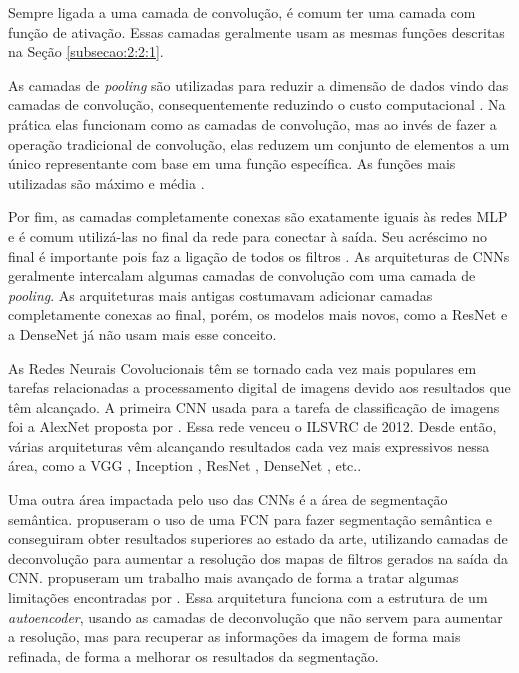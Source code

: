 Sempre ligada a uma camada de convolução, é comum ter uma camada com função de ativação. Essas camadas geralmente usam as mesmas funções descritas na Seção \ref{subsecao:2:2:1}.

As camadas de \textit{pooling} são utilizadas para reduzir a dimensão de dados vindo das camadas de convolução, consequentemente reduzindo o custo computacional \cite{ferreira-2017}. Na prática elas funcionam como as camadas de convolução, mas ao invés de fazer a operação tradicional de convolução, elas reduzem um conjunto de elementos a um único representante com base em uma função específica. As funções mais utilizadas são máximo e média \cite{ferreira-2017}.

Por fim, as camadas completamente conexas são exatamente iguais às redes MLP e é comum utilizá-las no final da rede para conectar à saída. Seu acréscimo no final é importante pois faz a ligação de todos os filtros \cite{ferreira-2017}. As arquiteturas de \ac{CNN}s geralmente intercalam algumas camadas de convolução com uma camada de \textit{pooling}. As arquiteturas mais antigas costumavam adicionar camadas completamente conexas ao final, porém, os modelos mais novos, como a \ac{ResNet} e a \ac{DenseNet} já não usam mais esse conceito.

As Redes Neurais Covolucionais têm se tornado cada vez mais populares em tarefas relacionadas a processamento digital de imagens devido aos resultados que têm alcançado. A primeira \ac{CNN} usada para a tarefa de classificação de imagens foi a AlexNet proposta por . Essa rede venceu o \ac{ILSVRC} de 2012. Desde então, várias arquiteturas vêm alcançando resultados cada vez mais expressivos nessa área, como a VGG \cite{simonyan-2014}, Inception \cite{szegedy-2015}, \ac{ResNet} \cite{he-2016}, \ac{DenseNet} \cite{liu-2017}, etc..

Uma outra área impactada pelo uso das \ac{CNN}s é a área de segmentação semântica.  propuseram o uso de uma \ac{FCN} para fazer segmentação semântica e conseguiram obter resultados superiores ao estado da arte, utilizando camadas de deconvolução para aumentar a resolução dos mapas de filtros gerados na saída da \ac{CNN}.  propuseram um trabalho mais avançado de forma a tratar algumas limitações encontradas por . Essa arquitetura funciona com a estrutura de um \textit{autoencoder}, usando as camadas de deconvolução que não servem para aumentar a resolução, mas para recuperar as informações da imagem de forma mais refinada, de forma a melhorar os resultados da segmentação.

